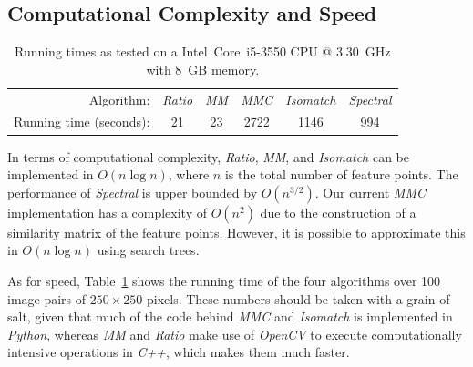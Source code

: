 \subsection{Computational Complexity and Speed}

\begin{table}[htb]
\caption{Running times as tested on a Intel\textregistered\ Core\texttrademark\ i5-3550 CPU @ 
3.30~GHz with 8~GB memory.}
\label{table:running_times}
	\centering
\begin{tabular}{r*{5}{c}}
\hline
	Algorithm: & \emph{Ratio} & \emph{MM} & \emph{MMC} %
& \emph{Isomatch} & \emph{Spectral}	\\
	\noalign{\smallskip} 
	Running time (seconds): & 21 & 23 & 2722 & 1146 & 994\\
	\hline
\end{tabular}
\end{table}
In terms of computational complexity, \emph{Ratio}, \emph{MM}, and 
\emph{Isomatch} can be implemented in $O(n\log n)$, where $n$ is the 
total number of feature points. The performance of \emph{Spectral} is 
upper bounded by $O(n^{3/2})$. Our current \emph{MMC} implementation has 
a complexity of $O(n^2)$ due to the construction of a similarity matrix 
of the feature points.  However, it is possible to approximate this in 
$O(n\log n)$ using search trees.  

As for speed, Table~\ref{table:running_times} shows the running time of 
the four algorithms over 100 image pairs of $250\!\times\!250$ pixels.  
These numbers should be taken with a grain of salt, given that much of 
the code behind \emph{MMC} and \emph{Isomatch} is implemented in 
\emph{Python}, whereas \emph{MM} and \emph{Ratio} make use of 
\emph{OpenCV} to execute computationally intensive operations in 
\emph{C++}, which makes them much faster. 

